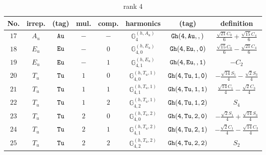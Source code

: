 \documentclass[fleqn,8pt]{jsarticle}
\begin{document}
\begin{table}[ht!]
\begin{center}
\caption{rank 4}
\renewcommand{\arraystretch}{1.3}
\begin{tabular}{cccccccc} \hline \hline
No. & irrep. & (tag) & mul. & comp. & harmonics & (tag) & definition \\ \hline
$ 17 $ & $ A_{u} $ & $ {\tt Au} $ & $ - $ & $ - $ & $ \mathbb{G}_{4}^{(h,A_{u})} $ & $ {\tt Gh(4,Au,,)} $ & $ \frac{\sqrt{21} C_{0}}{6} + \frac{\sqrt{15} C_{4}}{6} $ \\
$ 18 $ & $ E_{u} $ & $ {\tt Eu} $ & $ - $ & $ 0 $ & $ \mathbb{G}_{4,0}^{(h,E_{u})} $ & $ {\tt Gh(4,Eu,,0)} $ & $ \frac{\sqrt{15} C_{0}}{6} - \frac{\sqrt{21} C_{4}}{6} $ \\
$ 19 $ & $ E_{u} $ & $ {\tt Eu} $ & $ - $ & $ 1 $ & $ \mathbb{G}_{4,1}^{(h,E_{u})} $ & $ {\tt Gh(4,Eu,,1)} $ & $ - C_{2} $ \\
$ 20 $ & $ T_{u} $ & $ {\tt Tu} $ & $ 1 $ & $ 0 $ & $ \mathbb{G}_{4,0}^{(h,T_{u},1)} $ & $ {\tt Gh(4,Tu,1,0)} $ & $ - \frac{\sqrt{14} S_{1}}{4} - \frac{\sqrt{2} S_{3}}{4} $ \\
$ 21 $ & $ T_{u} $ & $ {\tt Tu} $ & $ 1 $ & $ 1 $ & $ \mathbb{G}_{4,1}^{(h,T_{u},1)} $ & $ {\tt Gh(4,Tu,1,1)} $ & $ \frac{\sqrt{14} C_{1}}{4} - \frac{\sqrt{2} C_{3}}{4} $ \\
$ 22 $ & $ T_{u} $ & $ {\tt Tu} $ & $ 1 $ & $ 2 $ & $ \mathbb{G}_{4,2}^{(h,T_{u},1)} $ & $ {\tt Gh(4,Tu,1,2)} $ & $ S_{4} $ \\
$ 23 $ & $ T_{u} $ & $ {\tt Tu} $ & $ 2 $ & $ 0 $ & $ \mathbb{G}_{4,0}^{(h,T_{u},2)} $ & $ {\tt Gh(4,Tu,2,0)} $ & $ - \frac{\sqrt{2} S_{1}}{4} + \frac{\sqrt{14} S_{3}}{4} $ \\
$ 24 $ & $ T_{u} $ & $ {\tt Tu} $ & $ 2 $ & $ 1 $ & $ \mathbb{G}_{4,1}^{(h,T_{u},2)} $ & $ {\tt Gh(4,Tu,2,1)} $ & $ - \frac{\sqrt{2} C_{1}}{4} - \frac{\sqrt{14} C_{3}}{4} $ \\
$ 25 $ & $ T_{u} $ & $ {\tt Tu} $ & $ 2 $ & $ 2 $ & $ \mathbb{G}_{4,2}^{(h,T_{u},2)} $ & $ {\tt Gh(4,Tu,2,2)} $ & $ S_{2} $ \\
 \hline \hline
\end{tabular}
\end{center}
\end{table}
\end{document}
